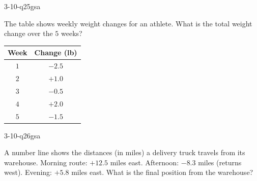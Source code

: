 \begin{practiceQuestion}{3-10-q25}{gsa}
\begin{questionText}
The table shows weekly weight changes for an athlete. What is the total weight change over the $5$ weeks?

\begin{center}
\begin{tabular}{|c|c|}
\hline
\textbf{Week} & \textbf{Change (lb)} \\
\hline
$1$ & $-2.5$ \\ \hline
$2$ & $+1.0$ \\ \hline
$3$ & $-0.5$ \\ \hline
$4$ & $+2.0$ \\ \hline
$5$ & $-1.5$ \\ \hline
\end{tabular}
\end{center}
\end{questionText}
\end{practiceQuestion}

\begin{practiceQuestion}{3-10-q26}{gsa}
\begin{questionText}
A number line shows the distances (in miles) a delivery truck travels from its warehouse. Morning route: $+12.5$ miles east. Afternoon: $-8.3$ miles (returns west). Evening: $+5.8$ miles east. What is the final position from the warehouse?

\begin{center}
\end{center}
\end{questionText}
\end{practiceQuestion}

